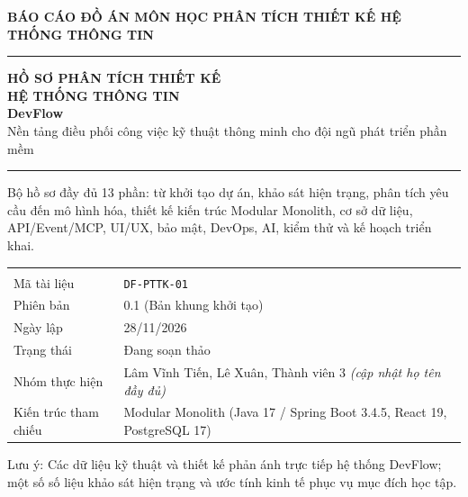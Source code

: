 
\begin{titlepage}
  \thispagestyle{empty}
  \vspace*{0.8cm}

  {\small\bfseries\color{pttkTeal} BÁO CÁO ĐỒ ÁN MÔN HỌC \;\textbar\; PHÂN TÍCH THIẾT KẾ HỆ THỐNG THÔNG TIN}

  \vspace{0.6cm}
  {\color{pttkNavy}\rule{\textwidth}{2.5pt}}
  \vspace{0.8cm}

  {\Huge\bfseries\color{pttkNavy} HỒ SƠ PHÂN TÍCH THIẾT KẾ}\\[0.35cm]
  {\Huge\bfseries\color{pttkNavy} HỆ THỐNG THÔNG TIN}\\[0.6cm]
  {\LARGE\bfseries\color{pttkTeal} DevFlow}\\[0.25cm]
  {\large\color{pttkText} Nền tảng điều phối công việc kỹ thuật thông minh cho đội ngũ phát triển phần mềm}

  \vspace{0.6cm}
  {\color{pttkBorder}\rule{\textwidth}{0.8pt}}
  \vspace{0.5cm}

  {\normalsize\color{pttkMuted}
  Bộ hồ sơ đầy đủ 13 phần: từ khởi tạo dự án, khảo sát hiện trạng, phân tích yêu cầu đến mô hình hóa, thiết kế kiến trúc Modular Monolith, cơ sở dữ liệu, API/Event/MCP, UI/UX, bảo mật, DevOps, AI, kiểm thử và kế hoạch triển khai.}

  \vspace{1.2cm}

  \begin{tabularx}{\textwidth}{L{4.2cm} Y}
     &  \\
    Mã tài liệu & \texttt{DF-PTTK-01} \\
    Phiên bản & 0.1 (Bản khung khởi tạo) \\
    Ngày lập & 28/11/2026 \\
    Trạng thái & Đang soạn thảo \\
    Nhóm thực hiện & Lâm Vĩnh Tiến, Lê Xuân, Thành viên 3 \emph{(cập nhật họ tên đầy đủ)} \\
    Kiến trúc tham chiếu & Modular Monolith (Java 17 / Spring Boot 3.4.5, React 19, PostgreSQL 17) \\
    \bottomrule
  \end{tabularx}

  \vfill
  {\footnotesize\color{pttkMuted}
  Lưu ý: Các dữ liệu kỹ thuật và thiết kế phản ánh trực tiếp hệ thống DevFlow; một số số liệu khảo sát hiện trạng và ước tính kinh tế phục vụ mục đích học tập.}
\end{titlepage}

